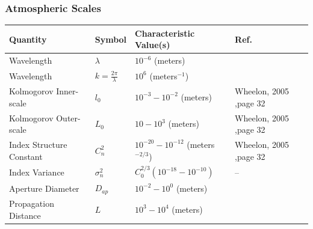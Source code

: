 \subsubsection{Atmospheric Scales}
\begin{tabular}{ |p{5cm}|p{3cm}|p{4.5cm}|p{3cm}| }
\hline
\textbf{Quantity} & \textbf{Symbol} & \textbf{Characteristic Value(s)} & \textbf{Ref.} \\
\hline
\hline
Wavelength               & $\lambda $    & $10^{-6} $ (meters)                    
& \cite{} \\
\hline
Wavelength               & $k= \frac{2\pi}{\lambda}$      & $10^{6} $ (meters$^{-1}$)    & \\               
\hline
Kolmogorov Inner-scale   & $l_0$         & $10^{-3}-10^{-2}$ (meters)             &  Wheelon, 2005 ,page 32 \\
\hline 
Kolmogorov Outer-scale   & $L_0$         & $10-10^{3}$ (meters)                   &  Wheelon, 2005 ,page 32 \\
\hline
Index Structure Constant & $C_n^2$       & $10^{-20}-10^{-12}$ (meters$^{-2/3}$)  &  Wheelon, 2005 ,page 32\\
\hline
Index Variance           & $\sigma_n^2$  & $C_0^{2/3} (10^{-18}-10^{-10})$        & --\\
\hline
Aperture Diameter        & $D_{ap}$      & $10^{-2}-10^{0}$ (meters)              & \\
\hline
Propagation Distance     & $L$           & $10^{3}-10^{4}$ (meters)               & \\
\hline
\end{tabular}









